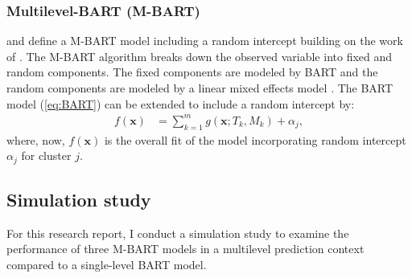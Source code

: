 \documentclass[10pt, a4paper, titlepage]{article}
\begin{document}
\subsubsection{Multilevel-BART (M-BART)}
\citet{chen2020, wagner2020} and \citet{tan2016} define a M-BART model including a random intercept building on the work of \citet{lin2019}. The M-BART algorithm breaks down the observed variable into fixed and random components. The fixed components are modeled by BART and the random components are modeled by a linear mixed effects model \citep{chen2020, wagner2020, tan2016}. The BART model (\ref{eq:BART}) can be extended to include a random intercept by:
\begin{subequations}
\label{eq:M-BART}
\begin{align}
f(\textbf{x}) &= \sum^{m}_{k=1}g(\textbf{x}; T_{k}, M_{k}) + \alpha_{j}, \tag{3}
\end{align}
\end{subequations} where, now, $f(\textbf{x})$ is the overall fit of the model incorporating random intercept $\alpha_{j}$ for cluster $j$.

\subsection{Simulation study}
For this research report, I conduct a simulation study to examine the performance of three M-BART models in a multilevel prediction context compared to a single-level BART model.
\end{document}

